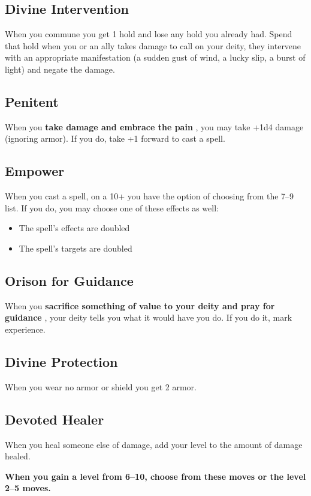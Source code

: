\subsection{Divine Intervention}


 When you commune you get 1 hold and lose any hold you already had. Spend that hold when you or an ally takes damage to call on your deity, they intervene with an appropriate manifestation (a sudden gust of wind, a lucky slip, a burst of light) and negate the damage.
\subsection{Penitent}


 When you \textbf{take damage and embrace the pain}
, you may take +1d4 damage (ignoring armor). If you do, take +1 forward to cast a spell.
\subsection{Empower}


 When you cast a spell, on a 10+ you have the option of choosing from the 7--9 list. If you do, you may choose one of these effects as well:
\begin{itemize}
\item The spell's effects are doubled
\item The spell's targets are doubled

\end{itemize}
\subsection{Orison for Guidance}


 When you \textbf{sacrifice something of value to your deity and pray for guidance}
, your deity tells you what it would have you do. If you do it, mark experience.
\subsection{Divine Protection}


 When you wear no armor or shield you get 2 armor.
\subsection{Devoted Healer}


 When you heal someone else of damage, add your level to the amount of damage healed.


\vspace{\baselineskip}
 {\bfseries When you gain a level from 6--10, choose from these moves or the level 2--5 moves.}
